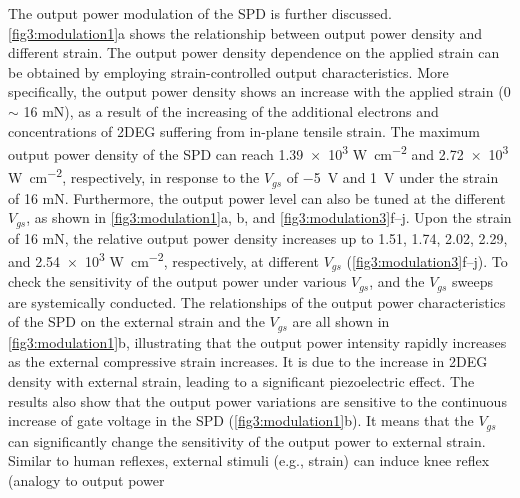 The output power  modulation  of the SPD  is further discussed. \autoref{fig3:modulation1}a shows the relationship between output power density and different strain. The output power density dependence on the applied strain can be obtained by employing strain-controlled output characteristics. More specifically, the output power density shows an increase with the applied strain (0 $\sim$ 16 \unit{\mN}), as a result of the increasing of the additional electrons and concentrations of 2DEG  suffering from in-plane tensile strain. The maximum output power density of the SPD  can reach \num{1.39e3} \unit{\W\per\square\cm} and \num{2.72e3} \unit{\W\per\square\cm}, respectively, in response to the $V_{gs}$ of \SI{-5}{\volt} and \SI{1}{\volt} under the strain of 16 \unit{\mN}. Furthermore, the output power level can also be tuned at the different $V_{gs}$, as shown in \autoref{fig3:modulation1}a, b, and \autoref{fig3:modulation3}f–j. Upon the strain of 16 \unit{\mN}, the relative output power density increases up to 1.51, 1.74, 2.02, 2.29, and \num{2.54e3} \unit{\W\per\square\cm}, respectively, at different $V_{gs}$ (\autoref{fig3:modulation3}f–j). To check the sensitivity of the output power under various $V_{gs}$, and the $V_{gs}$ sweeps are systemically conducted. The relationships of the output power characteristics of the SPD  on the external strain and the $V_{gs}$ are all shown in \autoref{fig3:modulation1}b, illustrating that the output power intensity rapidly increases as the external compressive strain increases. It is due to the increase in 2DEG density with external strain, leading to a significant piezoelectric  effect. The results also show that the output power variations are sensitive to the continuous increase of gate voltage  in the  SPD (\autoref{fig3:modulation1}b). It means that the $V_{gs}$ can significantly change the sensitivity of the output power to external strain. Similar to human reflexes, external stimuli (e.g., strain) can induce knee reflex (analogy to output  power

